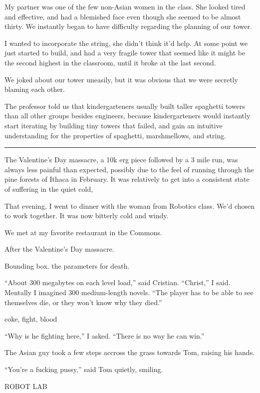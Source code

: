 My partner was one of the few non-Asian women in the class.  She looked tired
and effective, and had a blemished face even though she seemed to be almost
thirty.  We instantly began to have difficulty regarding the planning of our
tower.  

I wanted to incorporate the string, she didn't think it'd help.  At some point
we just started to build, and had a very fragile tower that seemed like it might
be the second highest in the classroom, until it broke at the last second.

We joked about our tower uneasily, but it was obvious that we were secretly
blaming each other.

The professor told us that kindergarteners usually built taller spaghetti towers
than all other groups besides engineers, because kindergarteners would
instantly start iterating by building tiny towers that failed, and gain an
intuitive understanding for the properties of spaghetti, marshmellows, and
string. 

\plainfancybreak{12pt}{2}{* * *}

The Valentine's Day massacre, a 10k erg piece followed by a 3 mile run, was
always less painful than expected, possibly due to the feel of running through
the pine forests of Ithaca in February.  It was relatively to get into a
consistent state of suffering in the quiet cold, 

That evening, I went to dinner with the woman from Robotics class.  We'd chosen
to work together.  It was now bitterly cold and windy.

We met at my favorite restaurant in the Commons.



After the Valentine's Day massacre.


Bounding box.  the parameters for death.

``About 300 megabytes on each level load,'' said Cristian.  ``Christ,'' I said.
Mentally I imagined 300 medium-length novels.  ``The player has to be able to
see themselves die, or they won't know why they died.'' 

coke, fight, blood

``Why is he fighting here,'' I asked.  ``There is no way he can win.'' 

The Asian guy took a few steps accross the grass towards Tom, raising his hands.

``You're a fucking pussy,'' said Tom quietly, smiling. 


ROBOT LAB


